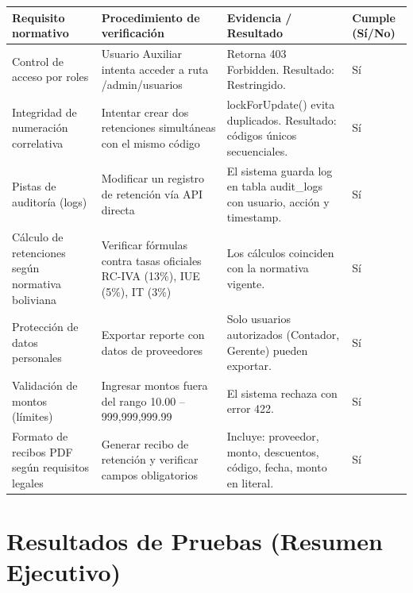 \documentclass[stu]{apa7}
\begin{document}
\begin{longtable}{|L{4cm}|L{4.5cm}|L{4.5cm}|C{1.5cm}|}
\hline
{}
\textbf{Requisito normativo} & \textbf{Procedimiento de verificación} & \textbf{Evidencia / Resultado} & \textbf{Cumple (Sí/No)} \\
\hline
Control de acceso por roles & Usuario Auxiliar intenta acceder a ruta /admin/usuarios & Retorna 403 Forbidden. Resultado: Restringido. & Sí \\
\hline
Integridad de numeración correlativa & Intentar crear dos retenciones simultáneas con el mismo código & lockForUpdate() evita duplicados. Resultado: códigos únicos secuenciales. & Sí \\
\hline
Pistas de auditoría (logs) & Modificar un registro de retención vía API directa & El sistema guarda log en tabla audit\_logs con usuario, acción y timestamp. & Sí \\
\hline
Cálculo de retenciones según normativa boliviana & Verificar fórmulas contra tasas oficiales RC-IVA (13\%), IUE (5\%), IT (3\%) & Los cálculos coinciden con la normativa vigente. & Sí \\
\hline
Protección de datos personales & Exportar reporte con datos de proveedores & Solo usuarios autorizados (Contador, Gerente) pueden exportar. & Sí \\
\hline
Validación de montos (límites) & Ingresar montos fuera del rango 10.00 -- 999,999,999.99 & El sistema rechaza con error 422. & Sí \\
\hline
Formato de recibos PDF según requisitos legales & Generar recibo de retención y verificar campos obligatorios & Incluye: proveedor, monto, descuentos, código, fecha, monto en literal. & Sí \\
\hline
\end{longtable}

\section{Resultados de Pruebas (Resumen Ejecutivo)}
\end{document}
